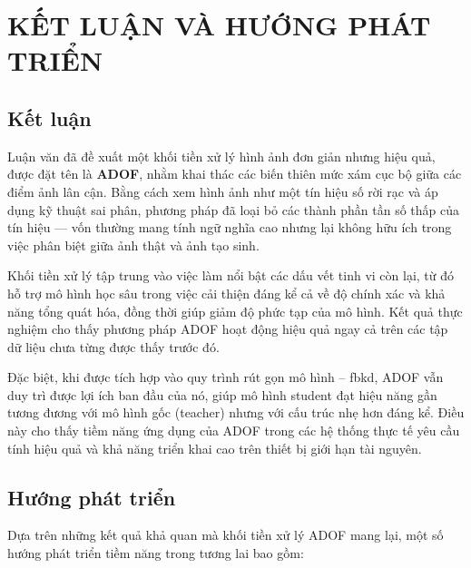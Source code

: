 \chapter{KẾT LUẬN VÀ HƯỚNG PHÁT TRIỂN}

\section{Kết luận}
Luận văn đã đề xuất một khối tiền xử lý hình ảnh đơn giản nhưng hiệu quả, được đặt tên là \textbf{ADOF}, nhằm khai thác các biến thiên mức xám cục bộ giữa các điểm ảnh lân cận. Bằng cách xem hình ảnh như một tín hiệu số rời rạc và áp dụng kỹ thuật sai phân, phương pháp đã loại bỏ các thành phần tần số thấp của tín hiệu — vốn thường mang tính ngữ nghĩa cao nhưng lại không hữu ích trong việc phân biệt giữa ảnh thật và ảnh tạo sinh.

Khối tiền xử lý tập trung vào việc làm nổi bật các dấu vết tinh vi còn lại, từ đó hỗ trợ mô hình học sâu trong việc cải thiện đáng kể cả về độ chính xác và khả năng tổng quát hóa, đồng thời giúp giảm độ phức tạp của mô hình. Kết quả thực nghiệm cho thấy phương pháp ADOF hoạt động hiệu quả ngay cả trên các tập dữ liệu chưa từng được thấy trước đó.

Đặc biệt, khi được tích hợp vào quy trình rút gọn mô hình -- \gls{fbkd}, ADOF vẫn duy trì được lợi ích ban đầu của nó, giúp mô hình \gls{student} đạt hiệu năng gần tương đương với mô hình gốc (\gls{teacher}) nhưng với cấu trúc nhẹ hơn đáng kể. Điều này cho thấy tiềm năng ứng dụng của ADOF trong các hệ thống thực tế yêu cầu tính hiệu quả và khả năng triển khai cao trên thiết bị giới hạn tài nguyên.

\section{Hướng phát triển}
Dựa trên những kết quả khả quan mà khối tiền xử lý ADOF mang lại, một số hướng phát triển tiềm năng trong tương lai bao gồm:

